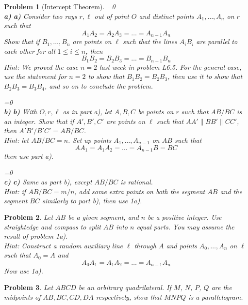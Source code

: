 \documentclass[a4paper,12pt]{article}
\theoremstyle{perfect}
\newtheorem{prb}{Problem}
\newcommand{\varline}{0}
\renewcommand\part[1]{
\ifnum\pdfstrcmp{\varline}{1}=0
    \vspace{.10in}\textbf{\\#1)}
  \else
    \textbf{#1)}
  \fi\renewcommand{\varline}{1}}
\begin{document}
\begin{prb}[Intercept Theorem]
\part{a} Consider two rays $r, \ell$ out of point $O$ and distinct points $A_1, \ldots, A_n$ on $r$ such that $$A_1A_2 = A_2A_3  = \ldots = A_{n-1}A_n$$ Show that if $B_1, \ldots, B_n$ are points on $\ell$ such that the lines $A_iB_i$ are parallel to each other for all $1 \leq i \leq n$, then $$B_1B_2 = B_2B_3  = \ldots = B_{n-1}B_n$$ \textit{Hint: We proved the case $n=2$ last week in problem L6.5. For the general case, use the statement for $n=2$ to show that $B_1B_2 = B_2B_3$, then use it to show that $B_2B_3 = B_3B_4$, and so on to conclude the problem.}
\part{b} With $O, r, \ell$ as in part a), let $A, B, C$ be points on $r$ such that $AB/BC$ is an integer. Show that if $A', B', C'$ are points on $\ell$ such that $AA' \parallel BB' \parallel CC'$, then $A'B'/B'C' = AB/BC$.\\
\textit{Hint: let $AB/BC = n$. Set up points $A_1, \ldots, A_{n-1}$ on $AB$ such that $$AA_1  = A_1A_2 = \ldots = A_{n-1}B = BC$$ then use part a).}
\part{c} Same as part b), except $AB/BC$ is rational.\\
\textit{Hint: if $AB/BC = m/n$, add some extra points on both the segment $AB$ and the segment $BC$ similarly to part b), then use 1a).}
\end{prb}

\begin{prb}
Let $AB$ be a given segment, and $n$ be a positive integer. Use straightedge and compass to split $AB$ into $n$ equal parts. You may assume the result of problem 1a).\\
\textit{Hint: Construct a random auxiliary line $\ell$ through $A$ and points $A_0, \ldots, A_{n}$ on $\ell$ such that $A_0 = A$ and $$A_0A_1 = A_1A_2 = \ldots = A_{n-1}A_n$$ Now use 1a).}
\end{prb}

\begin{prb}
Let $ABCD$ be an arbitrary quadrilateral. If $M$, $N$, $P$, $Q$ are the midpoints of $AB, BC, CD, DA$ respectively, show that $MNPQ$ is a parallelogram.
\end{prb}
\end{document}

